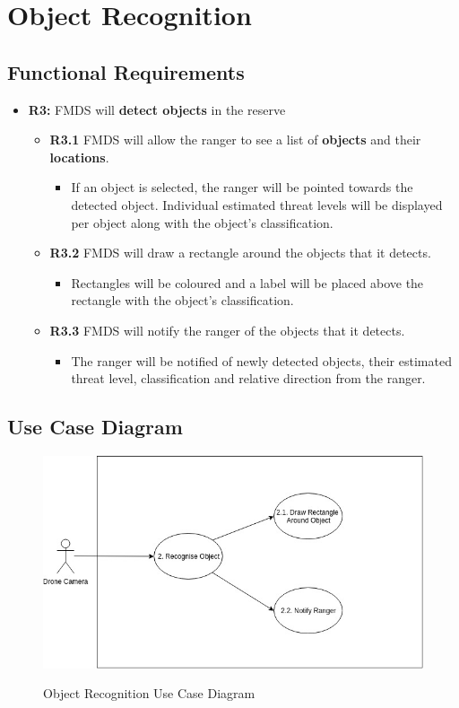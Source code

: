 \section{ Object Recognition }
\subsection{Functional Requirements}
	\begin{flushleft}
		\begin{itemize}
			\item{\textbf{R3:}} FMDS will \textbf{detect objects} in the reserve
				\begin{itemize}
					\item{\textbf{R3.1}} FMDS will allow the ranger to see a list of \textbf{objects} and their \textbf{locations}.
						\begin{itemize}
							\item If an object is selected, the ranger will be pointed towards the detected object. Individual estimated threat levels will be displayed per object along with the object's classification.
						\end{itemize} 
					\item{\textbf{R3.2}} FMDS will draw a rectangle around the objects that it detects.
						\begin{itemize}
							\item Rectangles will be coloured and a label will be placed above the rectangle with the object's classification.
						\end{itemize} 
					\item{\textbf{R3.3}} FMDS will notify the ranger of the objects that it detects.
						\begin{itemize}
							\item The ranger will be notified of newly detected objects, their estimated threat level, classification and relative direction from the ranger.
						\end{itemize} 
				\end{itemize}
		\end{itemize}
	\end{flushleft}

\subsection{Use Case Diagram}
\begin{flushleft}
	\begin{figure}[h!]
		\centering
		\includegraphics[scale=0.5]{./assets/images/object-recognition-ucd.jpg}
		\label{fig: object-recognition-ucd }
		\caption{Object Recognition Use Case Diagram}
	\end{figure}

\end{flushleft}

